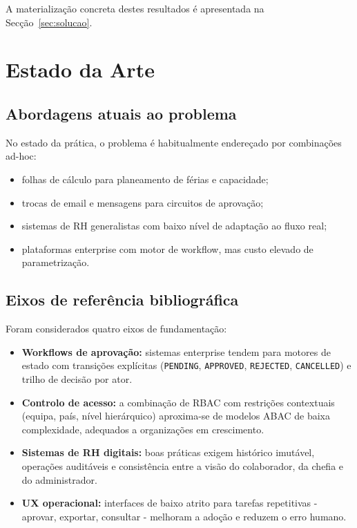 \documentclass[11pt,a4paper,twoside]{article}
\begin{document}
A materialização concreta destes resultados é apresentada na Secção~\ref{sec:solucao}.

\section{Estado da Arte}

\subsection{Abordagens atuais ao problema}

No estado da prática, o problema é habitualmente endereçado por combinações ad-hoc:

\begin{itemize}
  \item folhas de cálculo para planeamento de férias e capacidade;
  \item trocas de email e mensagens para circuitos de aprovação;
  \item sistemas de RH generalistas com baixo nível de adaptação ao fluxo real;
  \item plataformas enterprise com motor de workflow, mas custo elevado de parametrização.
\end{itemize}

\subsection{Eixos de referência bibliográfica}

Foram considerados quatro eixos de fundamentação:

\begin{itemize}
  \item \textbf{Workflows de aprovação:} sistemas enterprise tendem para motores de estado com transições explícitas (\texttt{PENDING}, \texttt{APPROVED}, \texttt{REJECTED}, \texttt{CANCELLED}) e trilho de decisão por ator.
  \item \textbf{Controlo de acesso:} a combinação de RBAC com restrições contextuais (equipa, país, nível hierárquico) aproxima-se de modelos ABAC de baixa complexidade, adequados a organizações em crescimento.
  \item \textbf{Sistemas de RH digitais:} boas práticas exigem histórico imutável, operações auditáveis e consistência entre a visão do colaborador, da chefia e do administrador.
  \item \textbf{UX operacional:} interfaces de baixo atrito para tarefas repetitivas - aprovar, exportar, consultar - melhoram a adoção e reduzem o erro humano.
\end{itemize}
\end{document}
